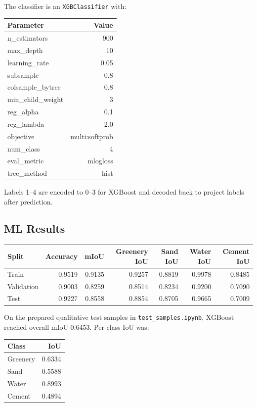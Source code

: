 \documentclass[11pt,a4paper]{article}
\begin{document}
The classifier is an \texttt{XGBClassifier} with:
\begin{center}
\begin{tabular}{lr}
\toprule
Parameter & Value \\
\midrule
n\_estimators & 900 \\
max\_depth & 10 \\
learning\_rate & 0.05 \\
subsample & 0.8 \\
colsample\_bytree & 0.8 \\
min\_child\_weight & 3 \\
reg\_alpha & 0.1 \\
reg\_lambda & 2.0 \\
objective & multi:softprob \\
num\_class & 4 \\
eval\_metric & mlogloss \\
tree\_method & hist \\
\bottomrule
\end{tabular}
\end{center}

Labels 1--4 are encoded to 0--3 for XGBoost and decoded back to project labels after prediction.

\subsection{ML Results}

\begin{center}
\begin{tabular}{lrrrrrr}
\toprule
Split & Accuracy & mIoU & Greenery IoU & Sand IoU & Water IoU & Cement IoU \\
\midrule
Train & 0.9519 & 0.9135 & 0.9257 & 0.8819 & 0.9978 & 0.8485 \\
Validation & 0.9003 & 0.8259 & 0.8514 & 0.8234 & 0.9200 & 0.7090 \\
Test & 0.9227 & 0.8558 & 0.8854 & 0.8705 & 0.9665 & 0.7009 \\
\bottomrule
\end{tabular}
\end{center}

On the prepared qualitative test samples in \texttt{test\_samples.ipynb}, XGBoost reached overall mIoU 0.6453. Per-class IoU was:
\begin{center}
\begin{tabular}{lr}
\toprule
Class & IoU \\
\midrule
Greenery & 0.6334 \\
Sand & 0.5588 \\
Water & 0.8993 \\
Cement & 0.4894 \\
\bottomrule
\end{tabular}
\end{center}
\end{document}

